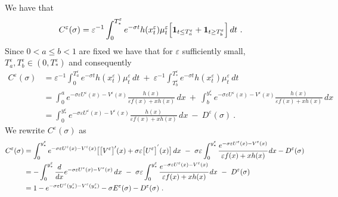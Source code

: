 \documentclass[reqno, 12pt, a4paper]{amsart}
\theoremstyle{plain}
\theoremstyle{definition}
\begin{document}
We have that
\begin{equation}
\begin{split}
C^\varepsilon (\sigma) &= \varepsilon^{-1} \int_0^{T_*^\varepsilon} e^{-\sigma t} h(x^\varepsilon_t) \mu^\varepsilon_t \Big[ {\bf 1}_{t\le T_a^\varepsilon} +{\bf 1}_{t \ge T_b^\varepsilon} \Big] \,  dt \ .
\end{split}
\end{equation}
Since $0<a\le b <1$ are fixed we have that for $\varepsilon$ sufficiently small, $T_a^\varepsilon, T_b^\varepsilon \in (0, T_*^\varepsilon)$ and consequently
\begin{equation}
\begin{split}
C^\varepsilon (\sigma)&= \varepsilon^{-1} \int_{0}^{T_a^\varepsilon} e^{-\sigma t} h(x^\varepsilon_t) \mu^\varepsilon_t \, dt \ + \ \varepsilon^{-1} \int_{T_b^\varepsilon}^{T_*^\varepsilon} e^{-\sigma t} h(x^\varepsilon_t) \mu^\varepsilon_t \, dt \\
&= \int_0^a e^{- \sigma \varepsilon U^\varepsilon (x) - V^\varepsilon (x) }\frac{h(x)}{\varepsilon f(x) + x h(x)} \, dx \ + \ \int_b^{y^\varepsilon_*} e^{- \sigma \varepsilon U^\varepsilon (x) - V^\varepsilon (x) }\frac{h(x)}{\varepsilon f(x) + x h(x)} \, dx \\
&= \int_0^{y^\varepsilon_*} e^{- \sigma \varepsilon U^\varepsilon (x) - V^\varepsilon (x) }\frac{h(x)}{\varepsilon f(x) + x h(x)} \, dx \ - \ D^\varepsilon (\sigma) \ .
\end{split}
\end{equation}
We rewrite $C^\varepsilon (\sigma)$ as
\begin{equation}
\begin{split}
C^\varepsilon (\sigma)&= \int_0^{y^\varepsilon_*} e^{- \sigma \varepsilon U^\varepsilon (x) - V^\varepsilon (x) } \big[ \big[V^{\varepsilon}\big]^\prime (x) +\sigma \varepsilon \big[U^\varepsilon\big]^{'} (x)  \big] \, dx \ - \  \sigma \varepsilon \int_0^{y^\varepsilon_*} \cfrac{e^{-\sigma \varepsilon U^\varepsilon (x) - V^\varepsilon (x) }}{\varepsilon f(x) +x h(x)} \, dx - D^\varepsilon (\sigma)\\
&= - \int_0^{y^\varepsilon_*} \frac{d}{dx} e^{- \sigma \varepsilon U^\varepsilon (x) - V^\varepsilon (x) } \, dx \ - \  \sigma \varepsilon \int_0^{y^\varepsilon_*} \cfrac{e^{-\sigma \varepsilon U^\varepsilon (x) - V^\varepsilon (x) }}{\varepsilon f(x) +x h(x)} \, dx \ - \  D^\varepsilon (\sigma)\\
&= 1 -e^{- \sigma \varepsilon U^\varepsilon (y^\varepsilon_*) - V^\varepsilon (y^\varepsilon_*)} -\sigma E^\varepsilon (\sigma) - D^\varepsilon (\sigma)  \ .
\end{split}
\end{equation}
\end{document}
